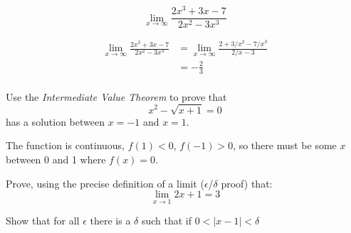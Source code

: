 \documentclass[letterpaper, landscape]{exam}
\begin{document}
\begin{questions}


    \question[8] 
    \label{q:last_limit}
      \[
        \lim_{x \to \infty} \frac{2x^3 + 3x - 7}{2x^2 - 3x^3}
      \]

      \begin{solution}
        \begin{align*}
          \lim_{x \to \infty} \frac{2x^3 + 3x - 7}{2x^2 - 3x^3} 
            & = \lim_{x \to \infty} \frac{2 + 3/x^2 - 7/x^3}{2/x - 3} \\
            & = \boxed{ - \frac{2}{3} } \\
        \end{align*}
      \end{solution}

    \ifprintanswers
      \newpage
    \fi

    \question[5] Use the {\em Intermediate Value Theorem} to prove that 
      \[
        x^2 - \sqrt{x + 1} = 0
      \]
      has a solution between $x = -1$ and $x = 1$.

      \begin{solution}
        The function is continuous, $f(1) < 0$, $f(-1) > 0$, so there must be some $x$ between 0 and
        1 where $f(x) = 0$.
      \end{solution}

    \question[10]
      Prove, using the precise definition of a limit ($\epsilon$/$\delta$ proof) that:
      \[
        \lim_{x \to 1} 2x + 1 = 3
      \]

      \begin{solution}
        Show that for all $\epsilon$ there is a $\delta$ such that if 
        $0 < |x - 1| < \delta$ 
        

\end{solution}
\end{questions}
\end{document}
